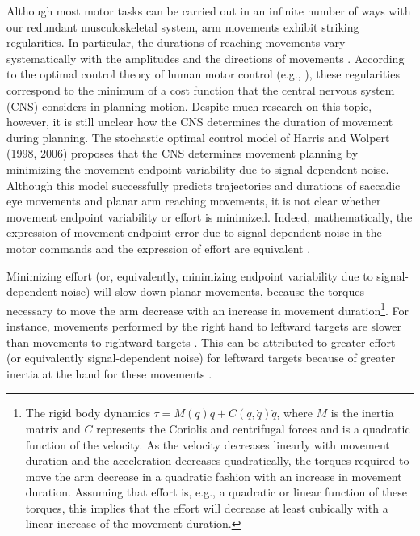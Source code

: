 Although most motor tasks can be carried out in an infinite number of ways with our redundant musculoskeletal system, arm movements exhibit striking regularities. 
In particular, the durations of reaching movements vary systematically with the amplitudes and the directions of movements \cite{Gordon1994}. 
According to the optimal control theory of human motor control (e.g., \cite{Flash1985, Hoff1994, Uno1989}), these regularities correspond to the minimum of a cost function that the central nervous system (CNS) considers in planning motion. Despite much research on this topic, however, it is still unclear how the CNS determines the duration of movement during planning. The stochastic optimal control model of Harris and Wolpert (1998, 2006) proposes that the CNS determines movement planning by minimizing the movement endpoint variability due to signal-dependent noise. Although this model successfully predicts trajectories and durations of saccadic eye movements and planar arm reaching movements, it is not clear whether movement endpoint variability or effort is minimized. Indeed, mathematically, the expression of movement endpoint error due to signal-dependent noise in the motor commands and the expression of effort are equivalent \cite{OSullivan2009}.

Minimizing effort (or, equivalently, minimizing endpoint variability due to signal-dependent noise) will slow down planar movements, because the torques necessary to move the arm decrease with an increase in movement duration\footnote{The rigid body dynamics $\tau = M(q)\ddot{q} + C(q,\dot{q})\dot{q}$, where $M$ is the inertia matrix and $C$ represents the Coriolis and centrifugal forces and is a quadratic function of the velocity. As the velocity decreases linearly with movement duration and the acceleration decreases quadratically, the torques required to move the arm decrease in a quadratic fashion with an increase in movement duration. Assuming that effort is, e.g., a quadratic or linear function of these torques, this implies that the effort will decrease at least cubically \cite{Shadmehr2016} with a linear increase of the movement duration.}. 
For instance, movements performed by the right hand to leftward targets are slower than movements to rightward targets \cite{Gordon1994,Park2016}. This can be attributed to greater effort (or equivalently signal-dependent noise) for leftward targets because of greater inertia at the hand for these movements \cite{Cos2011, Guigon2007, Schweighofer2015}. 

